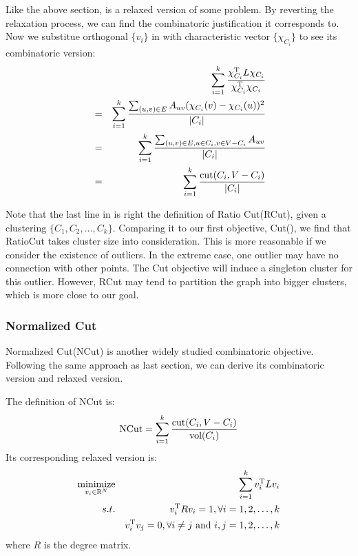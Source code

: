 Like the above section, \req{\ref{eq:rcut_opt3}} is a relaxed version 
of some problem. By reverting the relaxation process, we can find 
the combinatoric justification it corresponds to. Now we 
substitue orthogonal $ \{v_i\} $ in \req{\ref{eq:rcut_opt3}} 
with characteristic vector $ \{\chi_{C_i}\} $ to see its
combinatoric version:
\begin{eqnarray}
	&&\sum_{i=1}^{k}{ \frac{\chi_{C_i}^\mathrm{T} L \chi_{C_i}}{\chi_{C_i}^\mathrm{T}\chi_{C_i}} }
		\nonumber \\
	&=&	\sum_{i=1}^{k}
		{ \frac{\sum_{(u,v) \in E}{A_{uv}(\chi_{C_i}(v) - \chi_{C_i}(u))^2}}
		{|C_i|} } \nonumber \\
	&=&	\sum_{i=1}^{k}
		{ \frac{\sum_{(u,v) \in E,u \in C_i, v \in V-C_i}{A_{uv}}}
		{|C_i|} } \nonumber \\
	&=&	\sum_{i=1}^{k}
		{ \frac{\text{cut}(C_i, V-C_i)}
		{|C_i|} } 
	\label{eq:rcut_com}
\end{eqnarray}

Note that the last line in \req{\ref{eq:rcut_com}} is right the definition 
of Ratio Cut(RCut), given a clustering $ \{C_1, C_2, \ldots, C_k\} $. Comparing
it to our first objective, Cut(\req{\ref{eq:cut_def}}), we find that 
RatioCut takes cluster size into consideration. This is more reasonable 
if we consider the existence of outliers. In the extreme case, one 
outlier may have no connection with other points. The Cut objective 
will induce a singleton cluster for this outlier. However, RCut 
may tend to partition the graph into bigger clusters, which is more 
close to our goal. 


\subsubsection{Normalized Cut}
\label{sec:ncut}

Normalized Cut(NCut) is another widely studied combinatoric objective. 
Following the same approach as last section, we can derive 
its combinatoric version and relaxed version. 

The definition of NCut is:
\begin{equation}
	\text{NCut} = \sum_{i=1}^{k}{ \frac{\text{cut}(C_i, V-C_i)}{\text{vol}(C_i)} } 
\end{equation}
Its corresponding relaxed version is:
\begin{eqnarray}
	\operatorname*{minimize}_{v_i \in \mathbb{R}^N} 
	&& { \sum_{i=1}^{k}{v_i^\mathrm{T}Lv_i} } \nonumber \\
	s.t. && v_i^\mathrm{T}Rv_i = 1, \forall i=1,2,\ldots,k \nonumber \\
		 && v_i^\mathrm{T}v_j = 0, \forall i \ne j \text{~and~} i,j=1,2,\ldots,k\label{eq:ncut_opt}
\end{eqnarray}
where $ R $ is the degree matrix. 

